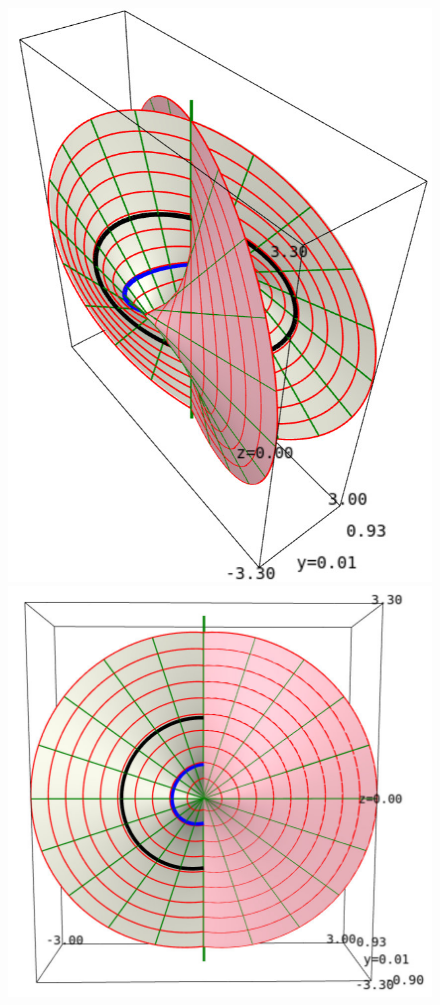 \begin{figure}
\begin{minipage}[c]{0.33\textwidth}
\includegraphics[height=0.35\textheight]{ksm_2_sheets.jpg}
\end{minipage}
\hfill
\begin{minipage}[c]{0.33\textwidth}
\includegraphics[height=0.25\textheight]{ksm_2_sheets_face_on.jpg}

\end{minipage}
\end{figure}
